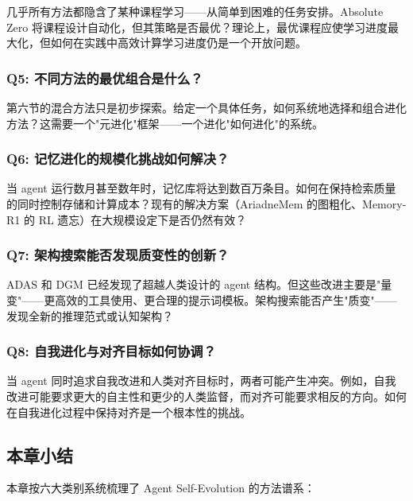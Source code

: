 几乎所有方法都隐含了某种课程学习——从简单到困难的任务安排。Absolute Zero 将课程设计自动化，但其策略是否最优？理论上，最优课程应使学习进度最大化，但如何在实践中高效计算学习进度仍是一个开放问题。

\subsubsection{Q5: 不同方法的最优组合是什么？}

第六节的混合方法只是初步探索。给定一个具体任务，如何系统地选择和组合进化方法？这需要一个"元进化"框架——一个进化"如何进化"的系统。

\subsubsection{Q6: 记忆进化的规模化挑战如何解决？}

当 agent 运行数月甚至数年时，记忆库将达到数百万条目。如何在保持检索质量的同时控制存储和计算成本？现有的解决方案（AriadneMem 的图粗化、Memory-R1 的 RL 遗忘）在大规模设定下是否仍然有效？

\subsubsection{Q7: 架构搜索能否发现质变性的创新？}

ADAS 和 DGM 已经发现了超越人类设计的 agent 结构。但这些改进主要是"量变"——更高效的工具使用、更合理的提示词模板。架构搜索能否产生"质变"——发现全新的推理范式或认知架构？

\subsubsection{Q8: 自我进化与对齐目标如何协调？}

当 agent 同时追求自我改进和人类对齐目标时，两者可能产生冲突。例如，自我改进可能要求更大的自主性和更少的人类监督，而对齐可能要求相反的方向。如何在自我进化过程中保持对齐是一个根本性的挑战。

\subsection{本章小结}\label{sec:ch3-summary}

本章按六大类别系统梳理了 Agent Self-Evolution 的方法谱系：

